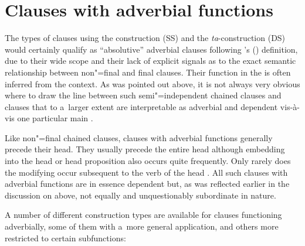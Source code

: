 \section{Clauses with adverbial functions}
\label{sec:13-4}

The types of clauses using the  construction (SS) and the \textit{ta}-construction (DS) would certainly qualify as ``absolutive'' adverbial clauses following \citeauthor{thompsonetal2007}'s (\citeyear[264--266]{thompsonetal2007}) definition, due to their wide scope and their lack of explicit signals as to the exact semantic relationship between non"=final and final clauses. Their function in the  is often inferred from the context. As was pointed out above, it is not always very obvious where to draw the line between such semi"=independent chained clauses and clauses that to a~larger extent are interpretable as adverbial and dependent vis-à-vis one particular main . 



Like non"=final chained clauses, clauses with adverbial functions generally precede their head. They usually precede the entire head  although embedding into the head  or head proposition also occurs quite frequently. Only rarely does the modifying  occur subsequent to the verb of the head . All such clauses with adverbial functions are in essence dependent but, as was reflected earlier in the discussion on  above, not equally and unquestionably subordinate in nature. 



A number of different construction types are available for clauses functioning adverbially, some of them with a~more general application, and others more restricted to certain subfunctions:


